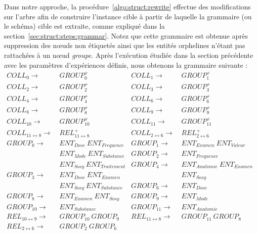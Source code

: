 Dans notre approche, la procédure~\ref{algo:struct:rewrite} effectue des modifications sur l'arbre afin de construire l'instance cible à partir de laquelle la grammaire (ou le schéma) cible est extraite, comme expliqué dans la section~\ref{sec:struct:steps:grammar}.
Notez que cette grammaire est obtenue après suppression des nœuds non étiquetés ainsi que les entités orphelines n'étant pas rattachées à un nœud \emph{groupe}.
Après l'exécution étudiée dans la section précédente avec les paramètres d'expériences définis, nous obtenons la grammaire suivante :
\begin{align*}
    COLL_0                      \to & ~ GROUP_0^+                     & COLL_1                     \to & ~ GROUP_1^+                     \\
    COLL_2                      \to & ~ GROUP_2^+                     & COLL_3                     \to & ~ GROUP_3^+                     \\
    COLL_4                      \to & ~ GROUP_4^+                     & COLL_6                     \to & ~ GROUP_6^+                     \\
    COLL_8                      \to & ~ GROUP_8^+                     & COLL_9                     \to & ~ GROUP_9^+                     \\
    COLL_{10}                   \to & ~ GROUP_{10}^+                  & COLL_{11}                  \to & ~ GROUP_{11}^+                  \\
    COLL_{11 \leftrightarrow 8} \to & ~ REL_{11 \leftrightarrow 8}^+  & COLL_{2 \leftrightarrow 6} \to & ~ REL_{2 \leftrightarrow 6}^+   \\
    GROUP_0                     \to & ~ ENT_{Dose} ~ ENT_{Frequence}  & GROUP_1                    \to & ~ ENT_{Examen} ~ ENT_{Valeur}   \\
                                    & ~ ENT_{Mode} ~ ENT_{Substance}  & GROUP_2                    \to & ~ ENT_{Frequence}               \\
                                    & ~ ENT_{Sosy} ~ ENT_{Traitement} & GROUP_4                    \to & ~ ENT_{Anatomie} ~ ENT_{Examen} \\
    GROUP_3                     \to & ~ ENT_{Dose} ~ ENT_{Examen}     &                                & ~ ENT_{Sosy}                    \\
                                    & ~ ENT_{Sosy} ~ ENT_{Substance}  & GROUP_6                    \to & ~ ENT_{Dose}                    \\
    GROUP_8                     \to & ~ ENT_{Examen} ~ ENT_{Sosy}     & GROUP_9                    \to & ~ ENT_{Mode}                    \\
    GROUP_{10}                  \to & ~ ENT_{Substance}               & GROUP_{11}                 \to & ~ ENT_{Anatomie}                \\
    REL_{10 \leftrightarrow 9}  \to & ~ GROUP_{10} ~ GROUP_9          & REL_{11 \leftrightarrow 8} \to & ~ GROUP_{11} ~ GROUP_8          \\
    REL_{2 \leftrightarrow 6}   \to & ~ GROUP_2 ~ GROUP_6
\end{align*}

